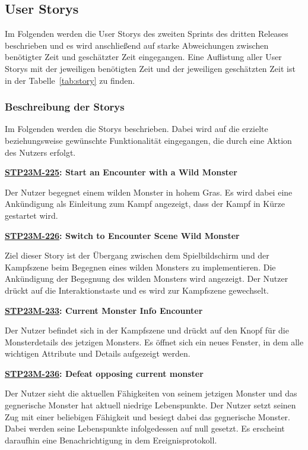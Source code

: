 \subsection{User Storys}
Im Folgenden werden die User Storys des zweiten Sprints des dritten Releases beschrieben und es wird anschließend auf starke Abweichungen zwischen benötigter Zeit und geschätzter Zeit eingegangen. Eine Auflistung aller User Storys mit der jeweiligen benötigten Zeit und der jeweiligen geschätzten Zeit ist in der Tabelle~\ref{tab:story} zu finden. 
\subsubsection{Beschreibung der Storys}

Im Folgenden werden die Storys beschrieben. Dabei wird auf die erzielte beziehungsweise gewünschte Funktionalität eingegangen, die durch eine Aktion des Nutzers erfolgt.

\textbf{\hyperlink{T225}{\hypertarget{S225}{STP23M-225}}: Start an Encounter with a Wild Monster}

Der Nutzer begegnet einem wilden Monster in hohem Gras. Es wird dabei eine Ankündigung als Einleitung zum Kampf angezeigt, dass der Kampf in Kürze gestartet wird.

\textbf{\hyperlink{T226}{\hypertarget{S226}{STP23M-226}}: Switch to Encounter Scene Wild Monster}

Ziel dieser Story ist der Übergang zwischen dem Spielbildschirm und der Kampfszene beim Begegnen eines wilden Monsters zu implementieren. Die Ankündigung der Begegnung des wilden Monsters wird angezeigt. Der Nutzer drückt auf die Interaktionstaste und es wird zur Kampfszene gewechselt.

\textbf{\hyperlink{T233}{\hypertarget{S233}{STP23M-233}}: Current Monster Info Encounter}

Der Nutzer befindet sich in der Kampfszene und drückt auf den Knopf für die Monsterdetails des jetzigen Monsters. Es öffnet sich ein neues Fenster, in dem alle wichtigen Attribute und Details aufgezeigt werden.

\textbf{\hyperlink{T236}{\hypertarget{S236}{STP23M-236}}: Defeat opposing current monster}

Der Nutzer sieht die aktuellen Fähigkeiten von seinem jetzigen Monster und das gegnerische Monster hat aktuell niedrige Lebenspunkte. Der Nutzer setzt seinen Zug mit einer beliebigen Fähigkeit und besiegt dabei das gegnerische Monster. Dabei werden seine Lebenspunkte infolgedessen auf null gesetzt. Es erscheint daraufhin eine Benachrichtigung in dem Ereignisprotokoll. 

